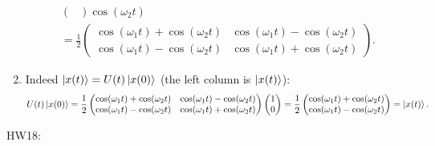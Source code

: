 \documentclass[11pt]{article}
\begin{document}
\begin{enumerate}[label=(\alph*)]
\begin{multline*}
\begin{pmatrix}
    \end{pmatrix}\cos(\omega_2 t) \\ = \frac{1}{2}\begin{pmatrix}
        \cos(\omega_1 t) + \cos(\omega_2 t) & \cos(\omega_1 t) - \cos(\omega_2 t) \\
        \cos(\omega_1 t) - \cos(\omega_2 t) & \cos(\omega_1 t) + \cos(\omega_2 t)
    \end{pmatrix}.\end{multline*}
    \item Indeed $\ket{x(t)} = U(t)\ket{x(0)}$ (the left column is $\ket{x(t)}$):
    \[U(t)\ket{x(0)} = \frac{1}{2}\begin{pmatrix}
        \cos(\omega_1 t) + \cos(\omega_2 t) & \cos(\omega_1 t) - \cos(\omega_2 t) \\
        \cos(\omega_1 t) - \cos(\omega_2 t) & \cos(\omega_1 t) + \cos(\omega_2 t)
    \end{pmatrix}\begin{pmatrix}
        1 \\ 0
    \end{pmatrix} = \frac{1}{2}\begin{pmatrix}
        \cos(\omega_1 t) + \cos(\omega_2 t) \\ \cos(\omega_1 t) - \cos(\omega_2 t)
    \end{pmatrix} = \ket{x(t)}.\]
\end{enumerate}
HW18:
\end{document}
